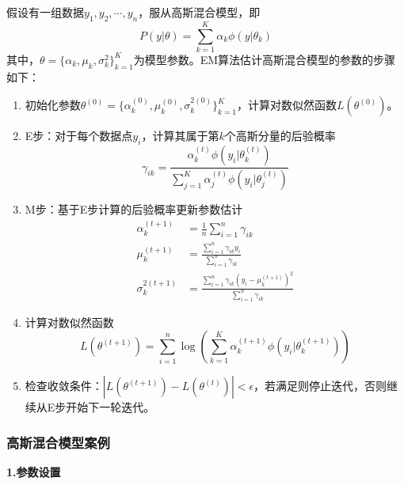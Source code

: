 \documentclass[a4paper,12pt]{ctexart} %
\begin{document}
假设有一组数据$y_1,y_2,\cdots,y_n$，服从高斯混合模型，即
\begin{equation}
P(y|\theta) = \sum_{k=1}^K \alpha_k \phi(y|\theta_k)
\end{equation}
其中，$\theta = \{\alpha_k,\mu_k,\sigma_k^2\}_{k=1}^K$为模型参数。EM算法估计高斯混合模型的参数的步骤如下：

\begin{enumerate}
    \item 初始化参数$\theta^{(0)} = \{\alpha_k^{(0)},\mu_k^{(0)},\sigma_k^{2(0)}\}_{k=1}^K$，计算对数似然函数$L(\theta^{(0)})$。
    
    \item E步：对于每个数据点$y_i$，计算其属于第$k$个高斯分量的后验概率
    \begin{equation}
    \gamma_{ik} = \frac{\alpha_k^{(t)}\phi(y_i|\theta_k^{(t)})}{\sum_{j=1}^K \alpha_j^{(t)}\phi(y_i|\theta_j^{(t)})}
    \end{equation}
    
    \item M步：基于E步计算的后验概率更新参数估计
    \begin{align}
    \alpha_k^{(t+1)} &= \frac{1}{n} \sum_{i=1}^n \gamma_{ik} \\
    \mu_k^{(t+1)} &= \frac{\sum_{i=1}^n \gamma_{ik}y_i}{\sum_{i=1}^n \gamma_{ik}} \\
    \sigma_k^{2(t+1)} &= \frac{\sum_{i=1}^n \gamma_{ik}(y_i-\mu_k^{(t+1)})^2}{\sum_{i=1}^n \gamma_{ik}}
    \end{align}
    
    \item 计算对数似然函数
    \begin{equation}
    L(\theta^{(t+1)}) = \sum_{i=1}^n\log\left(\sum_{k=1}^K \alpha_k^{(t+1)}\phi(y_i|\theta_k^{(t+1)})\right)
    \end{equation}
    
    \item 检查收敛条件：$|L(\theta^{(t+1)}) - L(\theta^{(t)})| < \epsilon$，若满足则停止迭代，否则继续从E步开始下一轮迭代。
\end{enumerate}

\subsubsection{高斯混合模型案例}
\begin{flushleft}
    \textbf{1.参数设置}
\end{flushleft}
\end{document}
